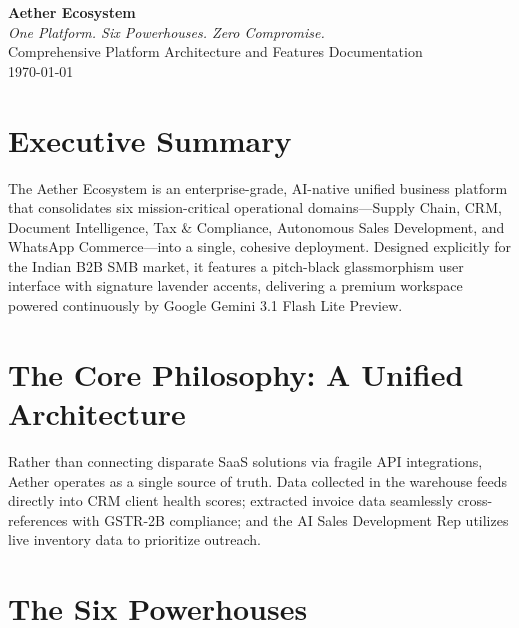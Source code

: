 \documentclass[12pt,a4paper]{article}
\begin{document}
\begin{center}
    {\Huge \textbf{Aether Ecosystem}}\\[1em]
    {\Large \textit{One Platform. Six Powerhouses. Zero Compromise.}}\\[2em]
    {\large Comprehensive Platform Architecture and Features Documentation}\\[1em]
    \today
\end{center}

\vspace{2em}
\tableofcontents
\newpage

\section{Executive Summary}
The Aether Ecosystem is an enterprise-grade, AI-native unified business platform that consolidates six mission-critical operational domains---Supply Chain, CRM, Document Intelligence, Tax \& Compliance, Autonomous Sales Development, and WhatsApp Commerce---into a single, cohesive deployment. Designed explicitly for the Indian B2B SMB market, it features a pitch-black glassmorphism user interface with signature lavender accents, delivering a premium workspace powered continuously by Google Gemini 3.1 Flash Lite Preview.

\section{The Core Philosophy: A Unified Architecture}
Rather than connecting disparate SaaS solutions via fragile API integrations, Aether operates as a single source of truth. 
Data collected in the warehouse feeds directly into CRM client health scores; extracted invoice data seamlessly cross-references with GSTR-2B compliance; and the AI Sales Development Rep utilizes live inventory data to prioritize outreach.

\section{The Six Powerhouses}
\end{document}

